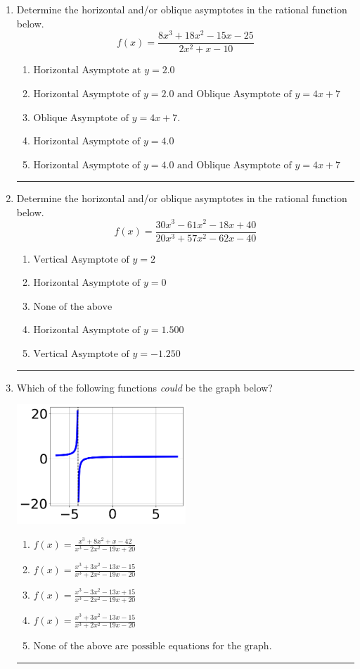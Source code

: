 \documentclass[14pt]{extbook}
\newcommand{\litem}[1]{\item#1\hspace*{-1cm}\rule{\textwidth}{0.4pt}}
\begin{document}
\begin{enumerate}
\litem{
Determine the horizontal and/or oblique asymptotes in the rational function below.\[ f(x) = \frac{8x^{3} +18 x^{2} -15 x -25}{2x^{2} +x -10} \]\begin{enumerate}[label=\Alph*.]
\item \( \text{Horizontal Asymptote at } y = 2.0 \)
\item \( \text{Horizontal Asymptote of } y = 2.0 \text{ and Oblique Asymptote of } y = 4x + 7 \)
\item \( \text{Oblique Asymptote of } y = 4x + 7. \)
\item \( \text{Horizontal Asymptote of } y = 4.0  \)
\item \( \text{Horizontal Asymptote of } y = 4.0 \text{ and Oblique Asymptote of } y = 4x + 7 \)

\end{enumerate} }
\litem{
Determine the horizontal and/or oblique asymptotes in the rational function below.\[ f(x) = \frac{30x^{3} -61 x^{2} -18 x + 40}{20x^{3} +57 x^{2} -62 x -40} \]\begin{enumerate}[label=\Alph*.]
\item \( \text{Vertical Asymptote of } y = 2  \)
\item \( \text{Horizontal Asymptote of } y = 0  \)
\item \( \text{None of the above} \)
\item \( \text{Horizontal Asymptote of } y = 1.500  \)
\item \( \text{Vertical Asymptote of } y = -1.250  \)

\end{enumerate} }
\litem{
Which of the following functions \textit{could} be the graph below?
\begin{center}
    \includegraphics[width=0.5\textwidth]{../Figures/identifyGraphOfRationalFunctionA.png}
\end{center}
\begin{enumerate}[label=\Alph*.]
\item \( f(x)=\frac{x^{3} +8 x^{2} +x -42}{x^{3} -2 x^{2} -19 x + 20} \)
\item \( f(x)=\frac{x^{3} +3 x^{2} -13 x -15}{x^{3} +2 x^{2} -19 x -20} \)
\item \( f(x)=\frac{x^{3} -3 x^{2} -13 x + 15}{x^{3} -2 x^{2} -19 x + 20} \)
\item \( f(x)=\frac{x^{3} +3 x^{2} -13 x -15}{x^{3} +2 x^{2} -19 x -20} \)
\item \( \text{None of the above are possible equations for the graph.} \)


\end{enumerate}}
\end{enumerate}
\end{document}
